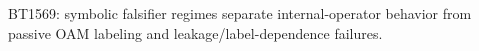 \begin{center}\small
BT1569: symbolic falsifier regimes separate internal-operator behavior from passive OAM labeling and leakage/label-dependence failures.
\end{center}
